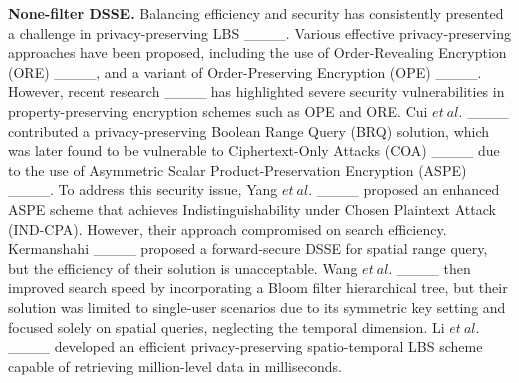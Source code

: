 \textbf{None-filter DSSE.} Balancing efficiency and security has consistently presented a challenge in privacy-preserving LBS ____. Various effective privacy-preserving approaches have been proposed, including the use of Order-Revealing Encryption (ORE) ____, and a variant of Order-Preserving Encryption (OPE) ____. However, recent research ____ has highlighted severe security vulnerabilities in property-preserving encryption schemes such as OPE and ORE. Cui $et\ al.$ ____ contributed a privacy-preserving Boolean Range Query (BRQ) solution, which was later found to be vulnerable to Ciphertext-Only Attacks (COA) ____ due to the use of Asymmetric Scalar Product-Preservation Encryption (ASPE) ____.
To address this security issue, Yang $et\ al.$ ____ proposed an enhanced ASPE scheme that achieves Indistinguishability under Chosen Plaintext Attack (IND-CPA). However, their approach compromised on search efficiency. Kermanshahi ____ proposed a forward-secure DSSE for spatial range query, but the efficiency of their solution is unacceptable. Wang $et\ al.$ ____ then improved search speed by incorporating a Bloom filter hierarchical tree, but their solution was limited to single-user scenarios due to its symmetric key setting and focused solely on spatial queries, neglecting the temporal dimension.  Li $et\ al.$ ____ developed an efficient privacy-preserving spatio-temporal LBS scheme capable of retrieving million-level data in milliseconds.

